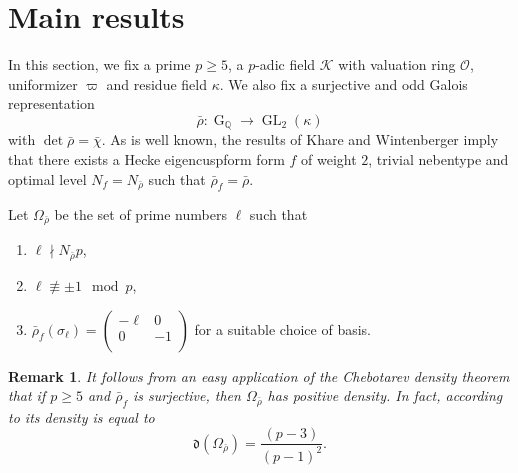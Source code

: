 \documentclass[table]{amsart}
\newtheorem{lemma}[theorem]{Lemma}
\newtheorem{remark}[theorem]{Remark}
\newcommand{\cK}{\mathcal{K}}
\newcommand{\Q}{\mathbb{Q}}
\newcommand{\cO}{\mathcal{O}}
\newcommand{\op}[1]{\operatorname{#1}}
\newcommand\mtx[4] { \left( {\begin{array}{cc}
 #1 & #2 \\
 #3 & #4 \\
 \end{array} } \right)}
\numberwithin{equation}{section}
\begin{document}
\section{Main results}
\par In this section, we fix a prime $p\geq 5$, a $p$-adic field $\cK$ with valuation ring $\cO$, uniformizer $\varpi$ and residue field $\kappa$. We also fix a surjective and odd Galois representation
\[\bar{\rho}:\op{G}_\Q\rightarrow \op{GL}_2(\kappa)\] with $\op{det}\bar{\rho}=\bar{\chi}$.
As is well known, the results of Khare and Wintenberger imply that there exists a Hecke eigencuspform form $f$ of weight $2$, trivial nebentype and optimal level $N_f=N_{\bar{\rho}}$ such that $\bar{\rho}_f=\bar{\rho}$.
\par Let $\Omega_{\bar{\rho}}$ be the set of prime numbers $\ell$ such that 
\begin{enumerate}
    \item $\ell\nmid N_{\bar{\rho}} p$, 
    \item $\ell\not\equiv \pm 1\mod{p}$,  \item$\bar{\rho}_f(\sigma_\ell)=\mtx{-\ell}{0}{0}{-1}$ for a suitable choice of basis. 
\end{enumerate}

\begin{remark}
    It follows from an easy application of the Chebotarev density theorem that if $p\geq 5$ and $\bar{\rho}_f$ is surjective, then $\Omega_{\bar{\rho}}$ has positive density. In fact, according to \cite[Proposition 5.2]{Rayblms} its density is equal to    \begin{equation}\label{density of Omega_f}
        \mathfrak{d}(\Omega_{\bar{\rho}})=\frac{(p-3)}{(p-1)^2}.
    \end{equation}
\end{remark}

\end{document}
